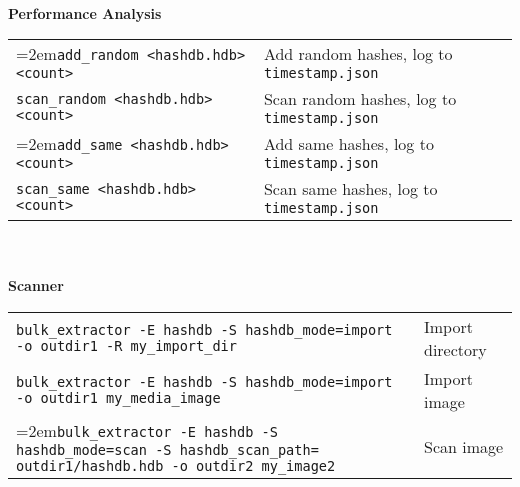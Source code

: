 \begin{footnotesize}
\\
\textbf{Performance Analysis}\\
\begin{tabular}{p{3.6 in} p{4 in}}
\hangindent=2em\texttt{add\_random <hashdb.hdb> <count>} & Add random hashes, log to \texttt{timestamp.json}\\
\texttt{scan\_random <hashdb.hdb> <count>} & Scan random hashes, log to \texttt{timestamp.json}\\
\hangindent=2em\texttt{add\_same <hashdb.hdb> <count>} & Add same hashes, log to \texttt{timestamp.json}\\
\texttt{scan\_same <hashdb.hdb> <count>} & Scan same hashes, log to \texttt{timestamp.json}\\
\end{tabular}
\\
\\
\textbf{\bulk Scanner}\\
\begin{tabular}{p{5.6 in} p{2 in}}
\texttt{bulk\_extractor -E hashdb -S hashdb\_mode=import -o outdir1 -R my\_import\_dir} & Import directory\\
\texttt{bulk\_extractor -E hashdb -S hashdb\_mode=import -o outdir1 my\_media\_image} & Import image\\
\hangindent=2em\texttt{bulk\_extractor -E hashdb -S hashdb\_mode=scan -S hashdb\_scan\_path= outdir1/hashdb.hdb -o outdir2 my\_image2} & Scan image\\
\end{tabular}
\end{footnotesize}

